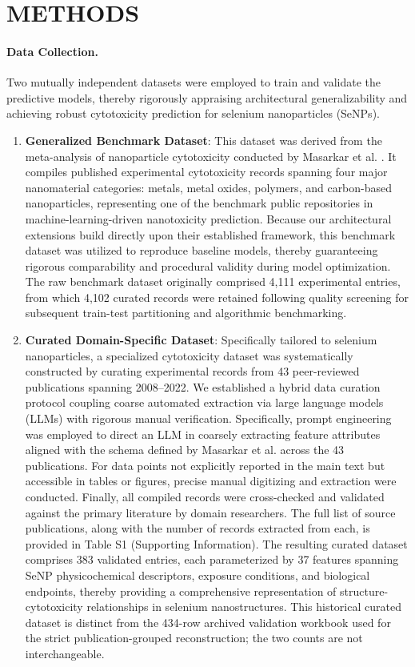 \section{METHODS}

\paragraph{Data Collection.}
Two mutually independent datasets were employed to train and validate the predictive models, thereby rigorously appraising architectural generalizability and achieving robust cytotoxicity prediction for selenium nanoparticles (SeNPs).

\begin{enumerate}
  \item \textbf{Generalized Benchmark Dataset}: This dataset was derived from the meta-analysis of nanoparticle cytotoxicity conducted by Masarkar et al. \cite{masarkar2024}. It compiles published experimental cytotoxicity records spanning four major nanomaterial categories: metals, metal oxides, polymers, and carbon-based nanoparticles, representing one of the benchmark public repositories in machine-learning-driven nanotoxicity prediction. Because our architectural extensions build directly upon their established framework, this benchmark dataset was utilized to reproduce baseline models, thereby guaranteeing rigorous comparability and procedural validity during model optimization. The raw benchmark dataset originally comprised 4,111 experimental entries, from which 4,102 curated records were retained following quality screening for subsequent train-test partitioning and algorithmic benchmarking.

  \item \textbf{Curated Domain-Specific Dataset}: Specifically tailored to selenium nanoparticles, a specialized cytotoxicity dataset was systematically constructed by curating experimental records from 43 peer-reviewed publications spanning 2008–2022. We established a hybrid data curation protocol coupling coarse automated extraction via large language models (LLMs) with rigorous manual verification. Specifically, prompt engineering was employed to direct an LLM in coarsely extracting feature attributes aligned with the schema defined by Masarkar et al. \cite{masarkar2024} across the 43 publications. For data points not explicitly reported in the main text but accessible in tables or figures, precise manual digitizing and extraction were conducted. Finally, all compiled records were cross-checked and validated against the primary literature by domain researchers. The full list of source publications, along with the number of records extracted from each, is provided in Table S1 (Supporting Information). The resulting curated dataset comprises 383 validated entries, each parameterized by 37 features spanning SeNP physicochemical descriptors, exposure conditions, and biological endpoints, thereby providing a comprehensive representation of structure-cytotoxicity relationships in selenium nanostructures. This historical curated dataset is distinct from the 434-row archived validation workbook used for the strict publication-grouped reconstruction; the two counts are not interchangeable.
\end{enumerate}

